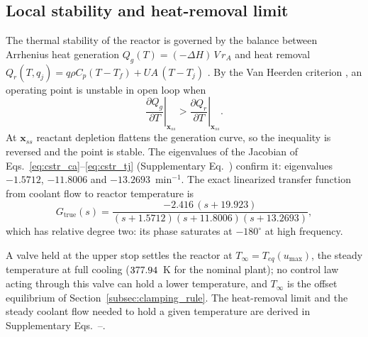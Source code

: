 \subsection{Local stability and heat-removal limit}
The thermal stability of the reactor is governed by the balance between Arrhenius heat generation $Q_g(T) = (-\Delta H)\,V\,r_A$ and heat removal $Q_r(T, q_j) = q \rho C_p (T - T_f) + UA\,(T - T_j)$ \cite{aris1958analysis, uppal1974dynamic}. By the Van Heerden criterion \cite{seborg2010process, bequette2003process}, an operating point is unstable in open loop when
\begin{equation}
    \left.\frac{\partial Q_g}{\partial T}\right|_{\mathbf{x}_{ss}} > \left.\frac{\partial Q_r}{\partial T}\right|_{\mathbf{x}_{ss}}.
    \label{eq:van_heerden}
\end{equation}
At $\mathbf{x}_{ss}$ reactant depletion flattens the generation curve, so the inequality is reversed and the point is stable. The eigenvalues of the Jacobian of Eqs.~\eqref{eq:cstr_ca}--\eqref{eq:cstr_tj} (Supplementary Eq.~) confirm it: eigenvalues $-1.5712$, $-11.8006$ and $-13.2693$~min$^{-1}$. The exact linearized transfer function from coolant flow to reactor temperature is
\begin{equation}
    G_{\text{true}}(s) = \frac{-2.416\,(s + 19.923)}{(s + 1.5712)(s + 11.8006)(s + 13.2693)},
    \label{eq:g_true_exact}
\end{equation}
which has relative degree two: its phase saturates at $-180^\circ$ at high frequency.

A valve held at the upper stop settles the reactor at $T_\infty = T_{eq}(u_{\max})$, the steady temperature at full cooling ($377.94$~K for the nominal plant); no control law acting through this valve can hold a lower temperature, and $T_\infty$ is the offset equilibrium of Section~\ref{subsec:clamping_rule}. The heat-removal limit and the steady coolant flow needed to hold a given temperature are derived in Supplementary Eqs.~--.

